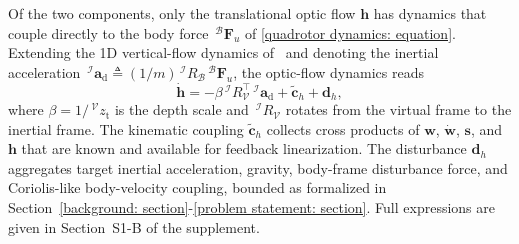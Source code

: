 Of the two components, only the translational optic flow $\boldsymbol{h}$ has dynamics that couple directly to the body force $\,^\mathcal{B}\boldsymbol{F}_u$ of \eqref{quadrotor dynamics: equation}. Extending the 1D vertical-flow dynamics of~\cite{singhal2025} and denoting the inertial acceleration $\,^\mathcal{I}\boldsymbol{a}_\text{d} \triangleq (1/m)\,^\mathcal{I}R_\mathcal{B}\,^\mathcal{B}\boldsymbol{F}_u$, the optic-flow dynamics reads
\begin{equation} \label{h dot: equation}
    \dot{\boldsymbol{h}} = -\beta\,^\mathcal{I}R_\mathcal{V}^\top\,^\mathcal{I}\boldsymbol{a}_\text{d} + \tilde{\boldsymbol{c}}_h + \boldsymbol{d}_h,
\end{equation}
where $\beta = 1/\,^\mathcal{V}z_\text{t}$ is the depth scale and $\,^\mathcal{I}R_\mathcal{V}$ rotates from the virtual frame to the inertial frame. The kinematic coupling $\tilde{\boldsymbol{c}}_h$ collects cross products of $\boldsymbol{w}$, $\dot{\boldsymbol{w}}$, $\boldsymbol{s}$, and $\boldsymbol{h}$ that are known and available for feedback linearization. The disturbance $\boldsymbol{d}_h$ aggregates target inertial acceleration, gravity, body-frame disturbance force, and Coriolis-like body-velocity coupling, bounded as formalized in Section~\ref{background: section}-\ref{problem statement: section}. Full expressions are given in Section~S1-B of the supplement.

